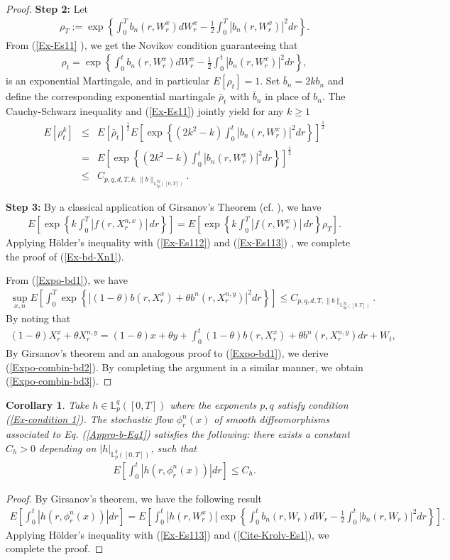 \documentclass[12pt,oneside, reqno]{amsart}
\newcommand{\be}{\begin{eqnarray}}
\newcommand{\ee}{\end{eqnarray}}
\newcommand{\ce}{\begin{eqnarray*}}
\newcommand{\de}{\end{eqnarray*}}
\newtheorem{corollary}[theorem]{Corollary}
\def\no{\nonumber}
\def\mL{{\mathbb L}}
\def\geq{\geqslant}
\def\leq{\leqslant}
\numberwithin{equation}{section}
\begin{document}
\begin{proof}
\textbf{Step 2:} Let 
\ce 
\rho_T:=\exp\left\{ \int_0^T b_n(r,W_r^x) dW_r^x-\frac{1}{2}\int_0^T |b_n(r,W_r^x)|^2dr\right\}.
\de 
From (\ref{Ex-Es11} ), we get the Novikov condition guaranteeing that
\ce 
\rho_t=\exp\left\{ \int_0^t b_n(r,W_r^x) dW_r^x-\frac{1}{2}\int_0^t |b_n(r,W_r^x)|^2dr\right\},
\de 
is an exponential Martingale, and in particular $E[\rho_t]=1$.
Set $\bar{b}_n=2k b_n$ and define the corresponding exponential martingale $\bar{\rho}_t$ with $\bar{b}_n$ in place of $b_n$. The Cauchy-Schwarz inequality and (\ref{Ex-Es11}) jointly yield for any $k\geq 1$
\be \label{Ex-Es113}
E[\rho_t^k]&\leq& E\left[ \bar{\rho}_t\right]^{\frac{1}{2}}E\left[\exp\left\{(2k^2-k)\int_0^t |b_n(r,W_r^x)|^2dr\right\} \right]^{\frac{1}{2}}\no\\
&=&E\left[\exp\left\{(2k^2-k)\int_0^t |b_n(r,W_r^x)|^2dr\right\} \right]^{\frac{1}{2}}\no\\
&\leq& C_{p,q,d,T,k,\|b\|_{\mL_{2p}^{2q}([0,T])}}.
\ee 

\textbf{Step 3:}  By a classical application of Girsanov's Theorem (cf. \cite[Theorem 7.7]{Liptser2013}), we have 
\ce 
E\left [\exp\left\{k\int_0^T |f(r,X_r^{n,x})|\,dr\right \}\right]
=E\left [\exp\left\{k\int_0^T |f(r,W_r^x)|\,dr\right \}\rho_T\right].
\de 
Applying H\"{o}lder's inequality with (\ref{Ex-Es112}) and (\ref{Ex-Es113}) , we complete the proof of (\ref{Ex-bd-Xn1}). 

From (\ref{Expo-bd1}), we have
\ce 
\sup_{x,n} E\left[\int_0^{T} \exp\left\{|(1-\theta)b(r,X_r^{x})+\theta  b^n(r,X_r^{n,y})|^2dr\right\} \right]\leq C_{p,q,d,T,\|b\|_{\mL_{2p}^{2q}([0,T])}}.
\de 
By noting that 
\ce 
(1-\theta)X_r^{x}+\theta X_r^{n,y}=(1-\theta)x+\theta y+\int_0^t (1-\theta)b(r,X_r^{x})+\theta b^n(r,X_r^{n,y})dr+W_t,
\de 
By Girsanov's theorem and an analogous proof to (\ref{Expo-bd1}), we derive (\ref{Expo-combin-bd2}). By completing the argument in a similar manner, we obtain (\ref{Expo-combin-bd3}).
\end{proof}



\begin{corollary}\label{stochastic-flow-bd1}
Take $h\in \mL_p^q([0,T])$ where the exponents $p,q$ satisfy condition  (\ref{Ex-condition 1}). The stochastic flow  $\phi_{r}^n(x)$ of smooth diffeomorphisms associated to Eq. (\ref{Appro-b-Eq1}) satisfies the following: there exists a constant  $C_h>0$ depending on $|h|_{\mL_p^q([0,T])}$, such that 
	\be\label{Flow-Es1}
	E\left[\int_0^t|h(r,\phi_{r}^n(x))|dr\right]\leq C_{h}.
	\ee
\end{corollary}
\begin{proof}
	By Girsanov's theorem, we have the following result
	\ce 
	E\left[\int_0^t|h(r,\phi_{r}^n(x))|dr\right]=E\left[\int_0^t|h(r,W_r^x)|\exp\left\{\int_0^t b_n(r,W_r) dW_r-\frac{1}{2}\int_0^t |b_n(r,W_r)|^2dr\right\}\right].
	\de 
Applying H\"{o}lder's inequality with (\ref{Ex-Es113}) and (\ref{Cite-Krolv-Es1}), we complete the proof.
\end{proof}
\end{document}
